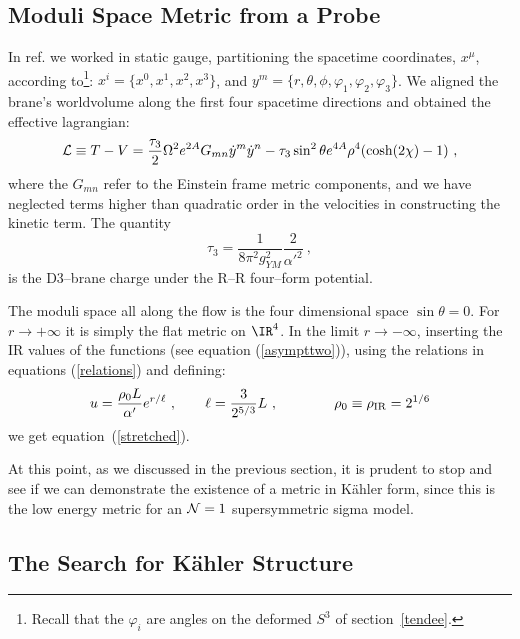 \documentclass[a4paper,12pt]{article}
\newcommand{\labell}[1]{\label{#1}}
\newcommand{\reef}[1]{(\ref{#1})}
\begin{document}
\subsection{Moduli Space Metric from a Probe}
  
In ref.\cite{jlp} we worked in static gauge, partitioning the
spacetime coordinates, $x^{\mu}$, according to\footnote{Recall that
  the $\varphi_i$ are angles on the deformed $S^3$ of
  section~\ref{tendee}.}: $x^i=\{x^0,x^1,x^2,x^3\}$, and
$y^m=\{r,\theta,\phi,\varphi_1,\varphi_2,\varphi_3\}$.  We aligned the
brane's worldvolume along the first four spacetime directions and
obtained the effective lagrangian:
\begin{eqnarray}  
{\cal L}\equiv T-V
={\tau_3\over2}
\Omega^2 e^{2A} G_{mn} {\dot y}^m{\dot y}^n
-\tau_3\sin^2\theta e^{4A}\rho^4(\cosh(2\chi)-1)\ ,  
\labell{theresult}
\end{eqnarray}  
where the $G_{mn}$ refer to the Einstein frame metric components, and
we have neglected terms higher than quadratic order in the velocities
in constructing the kinetic term.  The quantity
\begin{equation}
 \tau_3  =  \frac{1}{8\pi^2 g_{YM}^2} \frac{2}{{\alpha'}^2}\ ,
\labell{charge}
\end{equation}
is the D3--brane  charge under the R--R four--form potential.



The moduli space all along the flow is the four dimensional space
$\sin\theta=0$. For $r\to+\infty$ it is simply the flat metric on
$\IR^4$.  In the limit $r\to-\infty$, inserting the IR values of the
functions (see equation (\ref{asympttwo})), using the relations in
equations (\ref{relations}) and defining:
\begin{eqnarray}
u={\rho_0L\over\alpha^\prime}e^{{r/ \ell}}\ ,\qquad \ell={3\over 2^{5/3}}
 L\ ,\qquad
\qquad\rho_0\equiv\rho_{\rm
  IR}=2^{1/6}
\end{eqnarray}
we get equation~\reef{stretched}. 

At this point, as we discussed in the previous section, it is prudent
to stop and see if we can demonstrate the existence of a metric in
K\"ahler form, since this is the low energy metric for an ${\cal N}=1$
supersymmetric sigma model.


\subsection{The Search for K\"ahler Structure}
\end{document}
